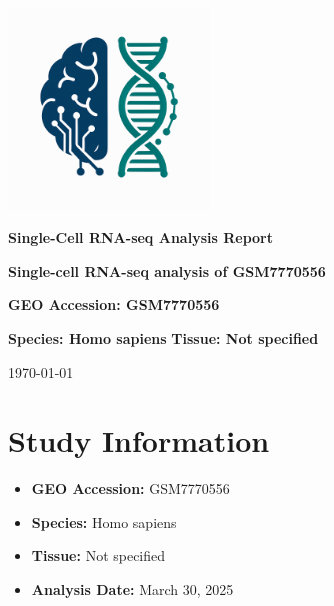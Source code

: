 \documentclass[12pt]{article}
\begin{document}
\begin{titlepage}
    \centering
    \vspace*{2cm}

    \includegraphics[width=0.4\textwidth]{scagentic_logo.png}
    \vspace{1cm}

    \Huge\textbf{Single-Cell RNA-seq Analysis Report}
    \vspace{1cm}

    \Large\textbf{Single-cell RNA-seq analysis of GSM7770556}
    \vspace{0.5cm}

    \Large\textbf{GEO Accession: GSM7770556}
    \vspace{0.5cm}

    \Large\textbf{Species: Homo sapiens}
    \vspace{0.5cm}
    \Large\textbf{Tissue: Not specified}
    \vspace{1cm}

    \large\today
\end{titlepage}

\tableofcontents
\newpage

\section{Study Information}
\begin{itemize}
    \item \textbf{GEO Accession:} GSM7770556
    \item \textbf{Species:} Homo sapiens
    \item \textbf{Tissue:} Not specified
    \item \textbf{Analysis Date:} March 30, 2025
\end{itemize}

\end{document}

